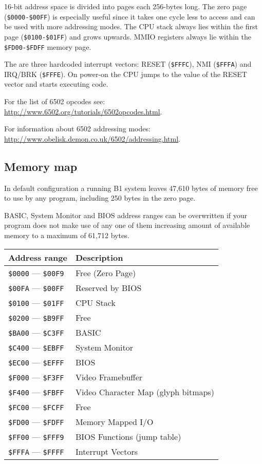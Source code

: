 \documentclass[a4paper,10pt,oneside]{article}
\begin{document}
16-bit address space is divided into pages each 256-bytes long. The zero page (\texttt{\$0000-\$00FF}) is especially useful since it takes one cycle less to access and can be used with more addressing modes. The CPU stack always lies within the first page (\texttt{\$0100-\$01FF}) and grows upwards. MMIO registers always lie within the \texttt{\$FD00-\$FDFF} memory page.

The are three hardcoded interrupt vectors: RESET (\texttt{\$FFFC}), NMI (\texttt{\$FFFA}) and IRQ/BRK (\texttt{\$FFFE}). On power-on the CPU jumps to the value of the RESET vector and starts executing code.

For the list of 6502 opcodes see: \url{http://www.6502.org/tutorials/6502opcodes.html}.

For information about 6502 addressing modes: \url{http://www.obelisk.demon.co.uk/6502/addressing.html}.

\subsection{Memory map}
In default configuration a running B1 system leaves 47,610 bytes of memory free to use by any program, including 250 bytes in the zero page.

BASIC, System Monitor and BIOS address ranges can be overwritten if your program does not make use of any one of them increasing amount of available memory to a maximum of 61,712 bytes. \vspace{5pt}

\begin{center}
  \begin{tabularx}{\textwidth}{ l | X }
    \textbf{Address range} & \textbf{Description} \\ \hline
    \texttt{\$0000} --- \texttt{\$00F9} & Free (Zero Page) \\
    \texttt{\$00FA} --- \texttt{\$00FF} & Reserved by BIOS \\
    \texttt{\$0100} --- \texttt{\$01FF} & CPU Stack \\
    \texttt{\$0200} --- \texttt{\$B9FF} & Free \\
    \texttt{\$BA00} --- \texttt{\$C3FF} & BASIC \\
    \texttt{\$C400} --- \texttt{\$EBFF} & System Monitor \\
    \texttt{\$EC00} --- \texttt{\$EFFF} & BIOS \\
    \texttt{\$F000} --- \texttt{\$F3FF} & Video Framebuffer \\
    \texttt{\$F400} --- \texttt{\$FBFF} & Video Character Map (glyph bitmaps) \\
    \texttt{\$FC00} --- \texttt{\$FCFF} & Free \\
    \texttt{\$FD00} --- \texttt{\$FDFF} & Memory Mapped I/O \\
    \texttt{\$FF00} --- \texttt{\$FFF9} & BIOS Functions (jump table) \\
    \texttt{\$FFFA} --- \texttt{\$FFFF} & Interrupt Vectors \\
  \end{tabularx}
\end{center}
\end{document}
